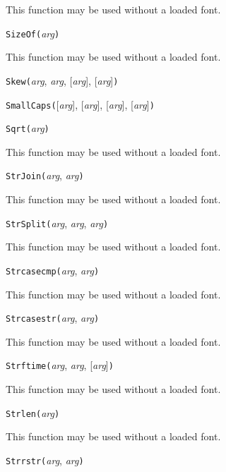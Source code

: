 This function may be used without a loaded font.


\noindent\texttt{SizeOf(}\textit{arg}\texttt{)}

This function may be used without a loaded font.


\noindent\texttt{Skew(}\textit{arg}, \textit{arg}, [\textit{arg}], [\textit{arg}]\texttt{)}


\noindent\texttt{SmallCaps(}[\textit{arg}], [\textit{arg}], [\textit{arg}], [\textit{arg}]\texttt{)}


\noindent\texttt{Sqrt(}\textit{arg}\texttt{)}

This function may be used without a loaded font.


\noindent\texttt{StrJoin(}\textit{arg}, \textit{arg}\texttt{)}

This function may be used without a loaded font.


\noindent\texttt{StrSplit(}\textit{arg}, \textit{arg}, \textit{arg}\texttt{)}

This function may be used without a loaded font.


\noindent\texttt{Strcasecmp(}\textit{arg}, \textit{arg}\texttt{)}

This function may be used without a loaded font.


\noindent\texttt{Strcasestr(}\textit{arg}, \textit{arg}\texttt{)}

This function may be used without a loaded font.


\noindent\texttt{Strftime(}\textit{arg}, \textit{arg}, [\textit{arg}]\texttt{)}

This function may be used without a loaded font.


\noindent\texttt{Strlen(}\textit{arg}\texttt{)}

This function may be used without a loaded font.


\noindent\texttt{Strrstr(}\textit{arg}, \textit{arg}\texttt{)}

